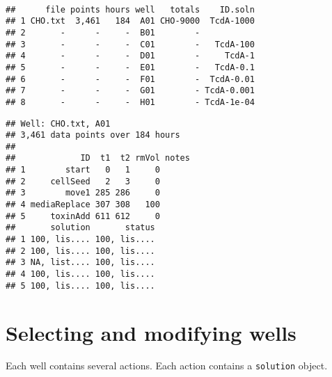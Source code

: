 \begin{knitrout}
\color{fgcolor}\begin{kframe}
\begin{alltt}
 \hlkwb{=} \hlstd{(} \hlstd{=} \\ \hlstd{,}  \hlstd{=} \hlstd{)}
\end{alltt}
\begin{alltt}
\hlstd{(wells[}\hlopt{:}\hlstd{])}
\end{alltt}
\begin{verbatim}
##      file points hours well   totals    ID.soln
## 1 CHO.txt  3,461   184  A01 CHO-9000  TcdA-1000
## 2       -      -     -  B01        -           
## 3       -      -     -  C01        -   TcdA-100
## 4       -      -     -  D01        -     TcdA-1
## 5       -      -     -  E01        -   TcdA-0.1
## 6       -      -     -  F01        -  TcdA-0.01
## 7       -      -     -  G01        - TcdA-0.001
## 8       -      -     -  H01        - TcdA-1e-04
\end{verbatim}
\begin{alltt}
\hlstd{(wells[[}\hlstd{]])}
\end{alltt}
\begin{verbatim}
## Well: CHO.txt, A01
## 3,461 data points over 184 hours
## 
##             ID  t1  t2 rmVol notes
## 1        start   0   1     0      
## 2     cellSeed   2   3     0      
## 3        move1 285 286     0      
## 4 mediaReplace 307 308   100      
## 5     toxinAdd 611 612     0      
##       solution       status
## 1 100, lis.... 100, lis....
## 2 100, lis.... 100, lis....
## 3 NA, list.... 100, lis....
## 4 100, lis.... 100, lis....
## 5 100, lis.... 100, lis....
\end{verbatim}
\end{kframe}
\end{knitrout}


\section{Selecting and modifying wells}
Each well contains several actions. Each action contains
a \texttt{solution} object.

